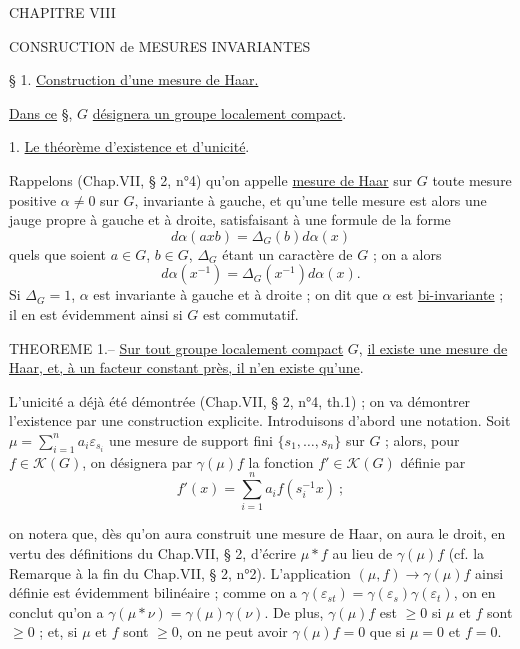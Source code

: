 
\begin{center}
CHAPITRE VIII

CONSRUCTION de MESURES INVARIANTES

§ 1. \uline{Construction d'une mesure de Haar.}
\end{center}

\uline{Dans ce} §, $G$ \uline{désignera un groupe localement compact}.

1. \uline{Le théorème d'existence et d'unicité}.

Rappelons (Chap.VII, § 2, n°4) qu'on appelle \uline{mesure de Haar} sur $G$ toute mesure positive $\alpha\neq0$ sur $G$, invariante à gauche, et qu'une telle mesure est alors une jauge propre à gauche et à droite, satisfaisant à une formule de la forme
\[
d\alpha(axb)=\Delta_G(b)d\alpha(x)
\]
quels que soient $a\in G$, $b\in G$, $\Delta_G$ étant un caractère de $G$ ; on a alors
\[
d\alpha(x^{-1})=\Delta_G(x^{-1})d\alpha(x).
\]
Si $\Delta_G=1$, $\alpha$ est invariante à gauche et à droite ; on dit que $\alpha$ est \uline{bi-invariante} ; il en est évidemment ainsi si $G$ est commutatif.

THEOREME 1.-- \uline{Sur tout groupe localement compact} $G$, \uline{il existe une mesure de Haar, et, à un facteur constant près, il n'en existe qu'une}.

L'unicité a déjà été démontrée (Chap.VII, § 2, n°4, th.1) ; on va démontrer l'existence par une construction explicite. Introduisons d'abord une notation. Soit $\mu=\sum_{i=1}^{n}a_i\varepsilon_{s_i}$ une mesure de support fini $\{s_1,\ldots,s_n\}$ sur $G$ ; alors, pour $f\in\mathcal{K}(G)$, on désignera par $\gamma(\mu)f$ la fonction $f'\in\mathcal{K}(G)$ définie par
\[
f'(x)=\sum_{i=1}^{n}a_i f(s_i^{-1}x)\ ;
\]

on notera que, dès qu'on aura construit une mesure de Haar, on aura le droit, en vertu des définitions du Chap.VII, § 2, d'écrire $\mu*f$ au lieu de $\gamma(\mu)f$ (cf. la Remarque à la fin du Chap.VII, § 2, n°2). L'application $(\mu,f)\longrightarrow\gamma(\mu)f$ ainsi définie est évidemment bilinéaire ; comme on a $\gamma(\varepsilon_{st})=\gamma(\varepsilon_s)\gamma(\varepsilon_t)$, on en conclut qu'on a $\gamma(\mu*\nu)=\gamma(\mu)\gamma(\nu)$. De plus, $\gamma(\mu)f$ est $\geq0$ si $\mu$ et $f$ sont $\geq0$ ; et, si $\mu$ et $f$ sont $\geq0$, on ne peut avoir $\gamma(\mu)f=0$ que si $\mu=0$ et $f=0$.
